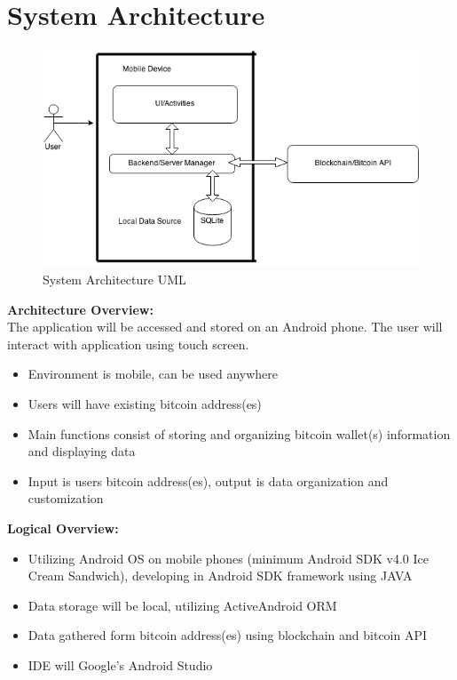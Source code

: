 \section{System Architecture}

\begin{figure}[H]
	\centering
	\includegraphics[scale=0.5]{../diagrams/systemArch.png}
	\caption{System Architecture UML}
\end{figure}

\textbf{Architecture Overview:}\\
The application will be accessed and stored on an Android phone.  The user will interact with application using touch screen.\\
\begin{itemize}
\item Environment is mobile, can be used anywhere 
\item Users will have existing bitcoin address(es)
\item Main functions consist of storing and organizing bitcoin wallet(s) information and displaying data
\item Input is users bitcoin address(es), output is data organization and customization\\
\end{itemize}

\textbf{Logical Overview:}\\

\begin{itemize}
\item Utilizing Android OS on mobile phones (minimum Android SDK v4.0 Ice Cream Sandwich), developing in Android SDK framework using JAVA
\item Data storage will be local, utilizing ActiveAndroid ORM
\item Data gathered form bitcoin address(es) using blockchain and bitcoin API
\item IDE will Google's Android Studio\\
\end{itemize}
	

